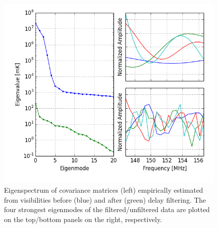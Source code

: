 \documentclass[twocolumn,numberedappendix]{emulateapj} \shorttitle{PSA64}
\begin{document}
\begin{figure}\centering
\includegraphics[width=1.5\columnwidth]{plots/eig.png}
\caption{
Eigenspectrum of covariance matrices (left) empirically estimated 
from visibilities before (blue) and after (green) delay filtering.
The four strongest eigenmodes of the filtered/unfiltered data are plotted
on the top/bottom panels on the right, respectively.
} \label{fig:eigs}
\end{figure}
\end{document}
